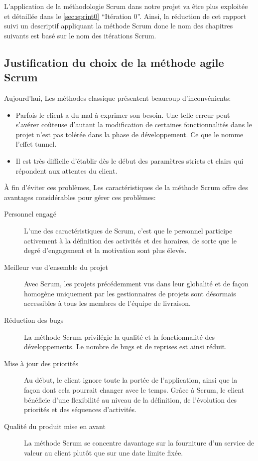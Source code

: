 L'application de la méthodologie Scrum dans notre projet 
va être plus exploitée et détaillée dans le \autoref{sec:sprint0} ``Itération
0''. Ainsi, la réduction de cet rapport suivi un descriptif appliquant la
méthode Scrum donc le nom des chapitres suivants est basé sur le nom des
itérations Scrum.

\subsection{Justification du choix de la méthode agile Scrum}

Aujourd'hui, Les méthodes classique présentent beaucoup d'inconvénients:

\begin{itemize}
    \item Parfois le client a du mal à exprimer son besoin. Une telle erreur
        peut s'avérer coûteuse d'autant la modification de certaines
        fonctionnalités dans le projet n'est pas tolérée dans la phase de
        développement. Ce que le nomme l'effet tunnel.
    \item Il est très difficile d'établir dès le début des paramètres stricts
        et clairs qui répondent aux attentes du client.
\end{itemize}

À fin d'éviter ces problèmes, Les caractéristiques de la méthode Scrum offre
des avantages considérables pour gérer ces problèmes:

\begin{description}
    \item [Personnel engagé] L'une des caractéristiques de Scrum, c'est que le
        personnel participe activement à la définition des activités et des
        horaires, de sorte que le degré d'engagement et la motivation sont plus
        élevés.
    \item [Meilleur vue d'ensemble du projet] Avec Scrum, les projets
        précédemment vus dans leur globalité et de façon homogène uniquement
        par les gestionnaires de projets sont désormais accessibles à tous les
        membres de l'équipe de livraison.
    \item [Réduction des bugs] La méthode Scrum privilégie la qualité et la
        fonctionnalité des développements. Le nombre de bugs et de reprises est
        ainsi réduit.
    \item [Mise à jour des priorités] Au début, le client ignore toute la
        portée de l'application, ainsi que la façon dont cela pourrait changer
        avec le temps. Grâce à Scrum, le client bénéficie d'une flexibilité au
        niveau de la définition, de l'évolution des priorités et des séquences
        d'activités.
    \item [Qualité du produit mise en avant] La méthode Scrum se concentre
        davantage sur la fourniture d'un service de valeur au client plutôt que
        sur une date limite fixée.
\end{description}

